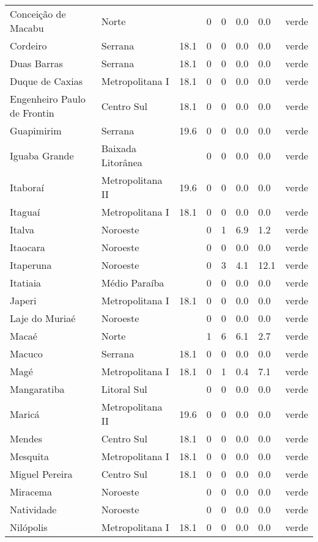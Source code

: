 \begin{longtable}{l|lllllll}
  Conceição de Macabu & Norte &  & 0 & 0 & 0.0 & 0.0 & verde \\ 
  Cordeiro & Serrana & 18.1 & 0 & 0 & 0.0 & 0.0 & verde \\ 
  Duas Barras & Serrana & 18.1 & 0 & 0 & 0.0 & 0.0 & verde \\ 
  Duque de Caxias & Metropolitana I & 18.1 & 0 & 0 & 0.0 & 0.0 & verde \\ 
  Engenheiro Paulo de Frontin & Centro Sul & 18.1 & 0 & 0 & 0.0 & 0.0 & verde \\ 
  Guapimirim & Serrana & 19.6 & 0 & 0 & 0.0 & 0.0 & verde \\ 
  Iguaba Grande & Baixada Litorânea &  & 0 & 0 & 0.0 & 0.0 & verde \\ 
  Itaboraí & Metropolitana II & 19.6 & 0 & 0 & 0.0 & 0.0 & verde \\ 
  Itaguaí & Metropolitana I & 18.1 & 0 & 0 & 0.0 & 0.0 & verde \\ 
  Italva & Noroeste &  & 0 & 1 & 6.9 & 1.2 & verde \\ 
  Itaocara & Noroeste &  & 0 & 0 & 0.0 & 0.0 & verde \\ 
  Itaperuna & Noroeste &  & 0 & 3 & 4.1 & 12.1 & verde \\ 
  Itatiaia & Médio Paraíba &  & 0 & 0 & 0.0 & 0.0 & verde \\ 
  Japeri & Metropolitana I & 18.1 & 0 & 0 & 0.0 & 0.0 & verde \\ 
  Laje do Muriaé & Noroeste &  & 0 & 0 & 0.0 & 0.0 & verde \\ 
  Macaé & Norte &  & 1 & 6 & 6.1 & 2.7 & verde \\ 
  Macuco & Serrana & 18.1 & 0 & 0 & 0.0 & 0.0 & verde \\ 
  Magé & Metropolitana I & 18.1 & 0 & 1 & 0.4 & 7.1 & verde \\ 
  Mangaratiba & Litoral Sul &  & 0 & 0 & 0.0 & 0.0 & verde \\ 
  Maricá & Metropolitana II & 19.6 & 0 & 0 & 0.0 & 0.0 & verde \\ 
  Mendes & Centro Sul & 18.1 & 0 & 0 & 0.0 & 0.0 & verde \\ 
  Mesquita & Metropolitana I & 18.1 & 0 & 0 & 0.0 & 0.0 & verde \\ 
  Miguel Pereira & Centro Sul & 18.1 & 0 & 0 & 0.0 & 0.0 & verde \\ 
  Miracema & Noroeste &  & 0 & 0 & 0.0 & 0.0 & verde \\ 
  Natividade & Noroeste &  & 0 & 0 & 0.0 & 0.0 & verde \\ 
  Nilópolis & Metropolitana I & 18.1 & 0 & 0 & 0.0 & 0.0 & verde \\ 

\end{longtable}
